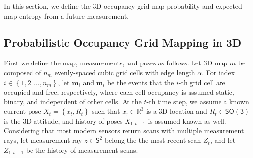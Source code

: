 \documentclass[conf]{new-aiaa}
\newcommand{\braces}[1]{\ensuremath{\left\{ #1 \right\}}}
\newcommand{\SO}{\ensuremath{\mathsf{SO(3)}}}
\renewcommand{\Re}{\ensuremath{\mathbb{R}}}
\newcommand{\Sph}{\ensuremath{\mathsf{S}}}
\begin{document}
In this section, we define the 3D occupancy grid map probability and expected map entropy from a future measurement.

\subsection{Probabilistic Occupancy Grid Mapping in 3D}

First we define the map, measurements, and poses as follows. Let 3D map $m$ be composed of $n_m$ evenly-spaced cubic grid cells with edge length $\alpha$. For index $i\in\braces{1,2,\ldots,n_m}$, let $\mathbf{m}_i$ and $\bar{\mathbf{m}}_i$ be the events that the $i$-th grid cell are occupied and free, respectively, where each cell occupancy is assumed static, binary, and independent of other cells. At the $t$-th time step, we assume a known current pose $X_t=\braces{x_t,R_t}$ such that $x_t\in\Re^3$ is a 3D location and $R_t\in\SO$ is the 3D attitude, and history of poses $X_{1:t-1}$ is assumed known as well. Considering that most modern sensors return scans with multiple measurement rays, let measurement ray $z\in\Sph^2$ belong the the most recent scan $Z_t$, and let $Z_{1:t-1}$ be the history of measurement scans.
\end{document}
